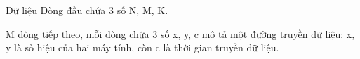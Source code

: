 Dữ liệu
Dòng đầu chứa 3 số N, M, K.  

   M dòng tiếp theo, mỗi dòng chứa 3 số x, y, c mô tả một đường truyền dữ liệu: x, y là số hiệu của hai máy tính, còn c là thời gian truyền dữ liệu.